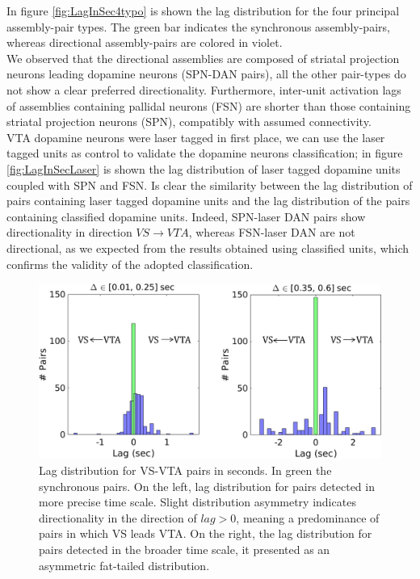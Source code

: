 In figure \ref{fig:LagInSec4typo} is shown the lag distribution for the four principal assembly-pair types. The green bar indicates the synchronous assembly-pairs, whereas directional assembly-pairs are colored in violet.\\
We observed that the directional assemblies are composed of striatal projection neurons leading dopamine neurons (SPN-DAN pairs), all the other pair-types do not show a clear preferred directionality. Furthermore, inter-unit activation lags of assemblies containing pallidal neurons (FSN) are shorter than those containing striatal projection neurons (SPN), compatibly with assumed connectivity.\\
VTA dopamine neurons were laser tagged in first place, we can use the laser tagged units as control to validate the dopamine neurons classification; in figure \ref{fig:LagInSecLaser} is shown the lag distribution of laser tagged dopamine units coupled with SPN and FSN. Is clear the similarity between the lag distribution of pairs containing laser tagged dopamine units and the lag distribution of the pairs containing classified dopamine units. Indeed, SPN-laser DAN pairs show directionality in direction $VS\rightarrow VTA$, whereas FSN-laser DAN are not directional, as we expected from the results obtained using classified units, which confirms the validity of the adopted classification.\\
\begin{figure}[H]
\centering
\includegraphics[scale=0.58]{figures/LagGeneral1.pdf}
\caption{Lag distribution for VS-VTA pairs in seconds. In green the synchronous pairs. On the left, lag distribution for pairs detected in more precise time scale. Slight distribution asymmetry indicates directionality in the direction of $lag > 0$, meaning a predominance of pairs in which VS leads VTA. On the right, the lag distribution for pairs detected in the broader time scale, it presented as an asymmetric fat-tailed distribution.}
\label{fig:LagInSecAll}
\end{figure}
